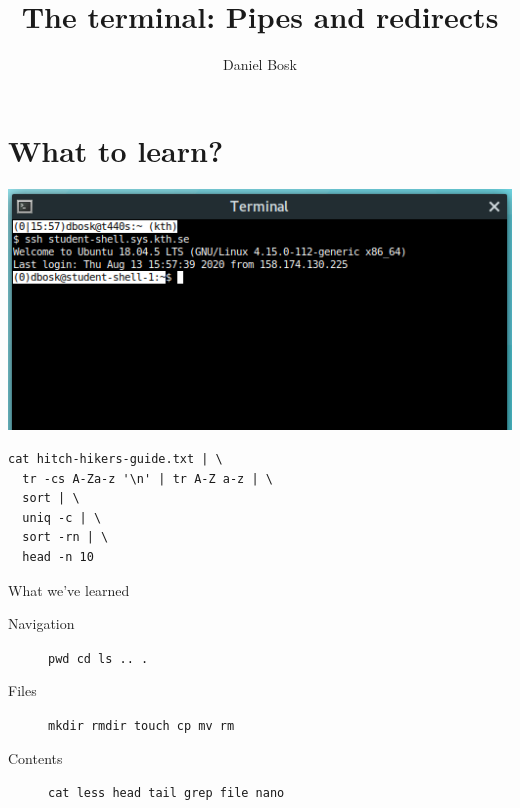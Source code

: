 \title{%
  The terminal: Pipes and redirects
}
\author{Daniel Bosk}


\mode*


\section{What to learn?}

\begin{frame}
  \includegraphics[width=\columnwidth]{../../ssh/terminal.png}
\end{frame}

\begin{frame}[fragile]
  \begin{lstlisting}[numbers=none]
cat hitch-hikers-guide.txt | \
  tr -cs A-Za-z '\n' | tr A-Z a-z | \
  sort | \
  uniq -c | \
  sort -rn | \
  head -n 10
  \end{lstlisting}
\end{frame}

\begin{frame}
  \begin{block}{What we've learned}
    \begin{description}
      \item[Navigation] \lstinline{pwd cd ls .. .}
      \item[Files] \lstinline{mkdir rmdir touch cp mv rm}
      \item[Contents] \lstinline{cat less head tail grep file nano}
    \end{description}
  \end{block}
\end{frame}


